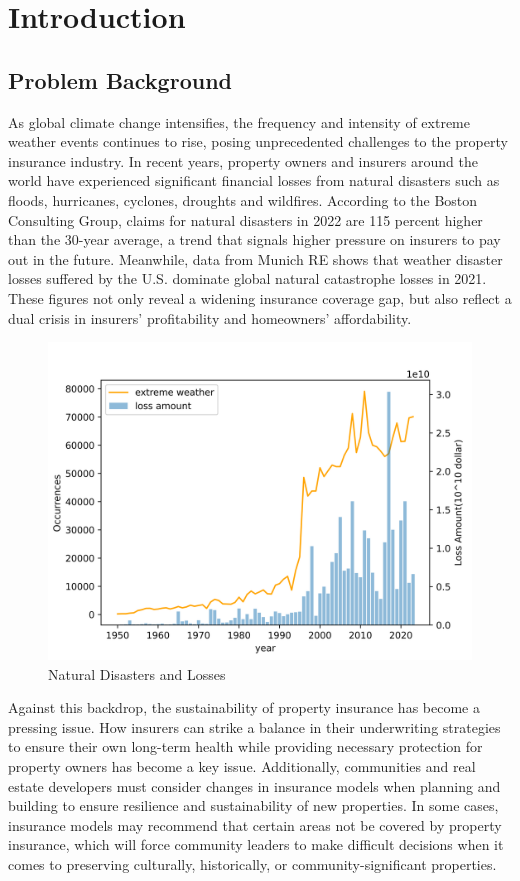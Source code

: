 \documentclass[12pt]{article}  %
\begin{document}
\maketitle  %
\tableofcontents  %


\section{Introduction}
\subsection{Problem Background}
As global climate change intensifies, the frequency and intensity of extreme weather events continues to rise, posing unprecedented challenges to the property insurance industry. In recent years, property owners and insurers around the world have experienced significant financial losses from natural disasters such as floods, hurricanes, cyclones, droughts and wildfires. According to the Boston Consulting Group, claims for natural disasters in 2022 are 115 percent higher than the 30-year average, a trend that signals higher pressure on insurers to pay out in the future. Meanwhile, data from Munich RE shows that weather disaster losses suffered by the U.S. dominate global natural catastrophe losses in 2021. These figures not only reveal a widening insurance coverage gap, but also reflect a dual crisis in insurers' profitability and homeowners' affordability.

\begin{figure}[htbp]
\centering
\includegraphics[width=.7\textwidth]{img/img05.png}
\caption{Natural Disasters and Losses}
\end{figure}

Against this backdrop, the sustainability of property insurance has become a pressing issue. How insurers can strike a balance in their underwriting strategies to ensure their own long-term health while providing necessary protection for property owners has become a key issue. Additionally, communities and real estate developers must consider changes in insurance models when planning and building to ensure resilience and sustainability of new properties. In some cases, insurance models may recommend that certain areas not be covered by property insurance, which will force community leaders to make difficult decisions when it comes to preserving culturally, historically, or community-significant properties.
\end{document}
